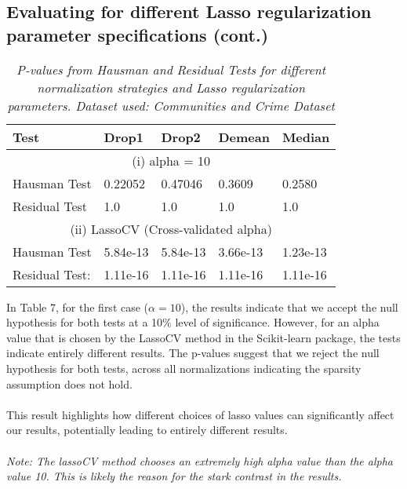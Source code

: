 \label{sec:appendix-A.1}

\subsection{Evaluating for different Lasso regularization parameter specifications (cont.)}
\begin{table}[h!]
\renewcommand{\arraystretch}{1.5}
\centering
\begin{tabular}{||l l l l l||} 
 \hline
 \hline
 Test & Drop1 & Drop2 &  Demean & Median \\ [0.5ex] 
 \hline \hline
 \multicolumn{5}{||c||}{(i) alpha = 10} \\ [0.5ex]
 Hausman Test & 0.22052 & 0.47046 & 0.3609 & 0.2580 \\ 
 Residual Test & 1.0 & 1.0 & 1.0 & 1.0 \\
 \hline
 \multicolumn{5}{||c||}{(ii) LassoCV (Cross-validated alpha) } \\ [0.5ex]
 Hausman Test & 5.84e-13 & 5.84e-13 & 3.66e-13 & 1.23e-13 \\ 
 Residual Test: & 1.11e-16 & 1.11e-16  & 1.11e-16 & 1.11e-16 \\ [1ex] 
 \hline \hline
\end{tabular}
\caption{\textit{P-values from Hausman and Residual Tests for different normalization strategies and Lasso regularization parameters. Dataset used: Communities and Crime Dataset}}
\label{table:1}
\end{table}

In Table 7, for the first case ($\alpha = 10$), the results indicate that we accept the null hypothesis for both tests at a 10\% level of significance. However, for an alpha value that is chosen by the LassoCV method in the Scikit-learn package, the tests indicate entirely different results. The p-values suggest that we reject the null hypothesis for both tests, across all normalizations indicating the sparsity assumption does not hold.\\ 
\\
This result highlights how different choices of lasso values can significantly affect our results, potentially leading to entirely different results. \\
\\
\textit{Note: The lassoCV method chooses an extremely high alpha value than the alpha value 10. This is likely the reason for the stark contrast in the results.}


